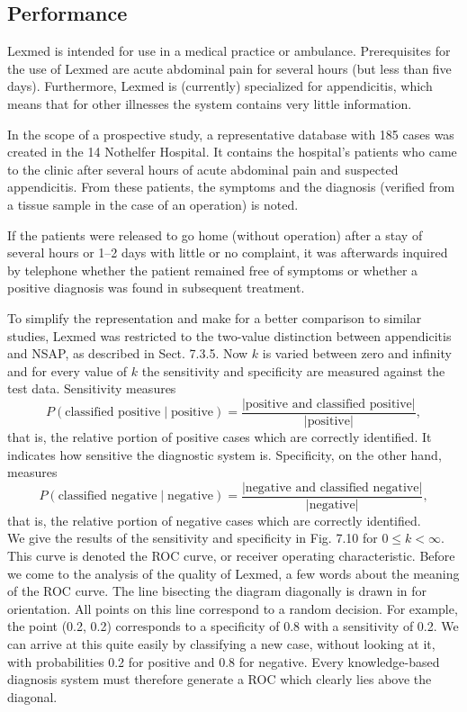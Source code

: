 \documentclass[10pt]{book}
\begin{document}
\subsection{Performance}
Lexmed is intended for use in a medical practice or ambulance. Prerequisites for the use of Lexmed are acute abdominal pain for several hours (but less than five days). Furthermore, Lexmed is (currently) specialized for appendicitis, which means that for other illnesses the system contains very little information.

In the scope of a prospective study, a representative database with 185 cases was created in the 14 Nothelfer Hospital. It contains the hospital's patients who came to the clinic after several hours of acute abdominal pain and suspected appendicitis. From these patients, the symptoms and the diagnosis (verified from a tissue sample in the case of an operation) is noted.

If the patients were released to go home (without operation) after a stay of several hours or 1--2 days with little or no complaint, it was afterwards inquired by telephone whether the patient remained free of symptoms or whether a positive diagnosis was found in subsequent treatment.

To simplify the representation and make for a better comparison to similar studies, Lexmed was restricted to the two-value distinction between appendicitis and NSAP, as described in Sect. 7.3.5. Now $k$ is varied between zero and infinity\\
and for every value of $k$ the sensitivity and specificity are measured against the test data. Sensitivity measures
\begin{equation*}
P(\text{classified positive} \mid \text{positive})=\frac{\lvert \text{positive and classified positive} \rvert}{\lvert \text{positive} \rvert}, \tag{7.16}
\end{equation*}
that is, the relative portion of positive cases which are correctly identified. It indicates how sensitive the diagnostic system is. Specificity, on the other hand, measures
\begin{equation*}
P(\text{classified negative} \mid \text{negative})=\frac{\lvert \text{negative and classified negative} \rvert}{\lvert \text{negative} \rvert}, \tag{7.17}
\end{equation*}
that is, the relative portion of negative cases which are correctly identified.\\
We give the results of the sensitivity and specificity in Fig. 7.10 for $0 \leq k<\infty$. This curve is denoted the ROC curve, or receiver operating characteristic. Before we come to the analysis of the quality of Lexmed, a few words about the meaning of the ROC curve. The line bisecting the diagram diagonally is drawn in for orientation. All points on this line correspond to a random decision. For example, the point (0.2, 0.2) corresponds to a specificity of 0.8 with a sensitivity of 0.2. We can arrive at this quite easily by classifying a new case, without looking at it, with probabilities 0.2 for positive and 0.8 for negative. Every knowledge-based diagnosis system must therefore generate a ROC which clearly lies above the diagonal.
\end{document}
